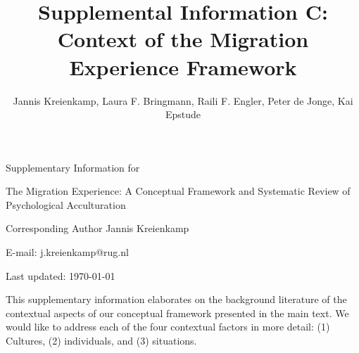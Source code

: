 \documentclass[man, 12pt, a4paper]{apa7}
\title{Supplemental Information C: Context of the Migration Experience Framework}
\author{Jannis Kreienkamp, Laura F. Bringmann, Raili F. Engler, Peter de Jonge, Kai Epstude}
\begin{document}
\begin{titlepage}
	{\noindent\Large Supplementary Information for \par}
	\vspace{0.5cm}
	{\noindent\Large The Migration Experience: A Conceptual Framework and Systematic Review of Psychological Acculturation\par}
	\vspace{1.5cm}
	{\noindent\LARGE\bfseries \thetitle \par}
	\vspace{2cm}
	{\noindent\Large\itshape \theauthor \par}
	\vfill
	\noindent Corresponding Author Jannis Kreienkamp\par
	\noindent E-mail: j.kreienkamp@rug.nl\par
	\vfill

	{\noindent Last updated: \today\par}
\end{titlepage}

\begin{center}
   \textbf{\thetitle} 
\end{center}

This supplementary information elaborates on the background literature of the contextual aspects of our conceptual framework presented in the main text. We would like to address each of the four contextual factors in more detail: (1) Cultures, (2) individuals, and (3) situations.
\end{document}
